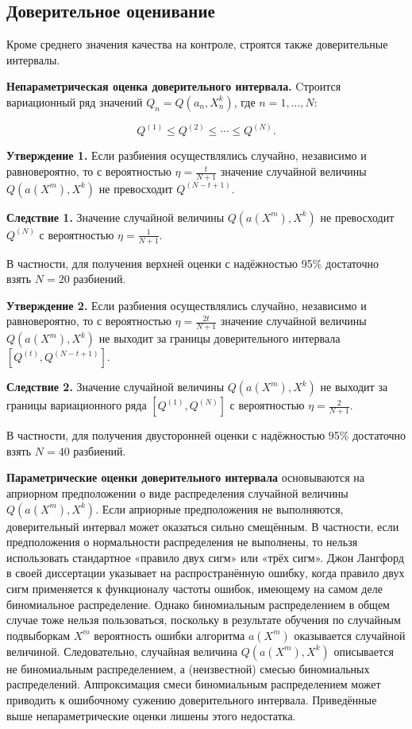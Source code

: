 \subsection{Доверительное оценивание}

Кроме среднего значения качества на контроле, строятся также доверительные интервалы.

\textbf{Непараметрическая оценка доверительного интервала.}
\newline
Cтроится вариационный ряд значений $Q_n = Q(a_n, X^k_n)$, где $n = 1, \ldots, N$:

\[
Q^{(1)} \leq Q^{(2)} \leq \cdots \leq Q^{(N)}.
\]

\textbf{Утверждение 1.} Если разбиения осуществлялись случайно, независимо и равновероятно, то с вероятностью $\eta = \frac{t}{N+1}$ значение случайной величины $Q(a(X^m), X^k)$ не превосходит $Q^{(N-t+1)}$.

\textbf{Следствие 1.} Значение случайной величины $Q(a(X^m), X^k)$ не превосходит $Q^{(N)}$ с вероятностью $\eta = \frac{1}{N+1}$.

В частности, для получения верхней оценки с надёжностью 95\% достаточно взять $N=20$ разбиений.

\textbf{Утверждение 2.} Если разбиения осуществлялись случайно, независимо и равновероятно, то с вероятностью $\eta = \frac{2t}{N+1}$ значение случайной величины $Q(a(X^m), X^k)$ не выходит за границы доверительного интервала $\left[ Q^{(t)}, Q^{(N-t+1)} \right]$.

\textbf{Следствие 2.} Значение случайной величины $Q(a(X^m), X^k)$ не выходит за границы вариационного ряда $\left[ Q^{(1)}, Q^{(N)} \right]$ с вероятностью $\eta = \frac{2}{N+1}$.

В частности, для получения двусторонней оценки с надёжностью 95\% достаточно взять $N=40$ разбиений.

\textbf{Параметрические оценки доверительного интервала} основываются на априорном предположении о виде распределения случайной величины $Q(a(X^m), X^k)$. Если априорные предположения не выполняются, доверительный интервал может оказаться сильно смещённым. В частности, если предположения о нормальности распределения не выполнены, то нельзя использовать стандартное «правило двух сигм» или «трёх сигм». Джон Лангфорд в своей диссертации \cite{Langford2002} указывает на распространённую ошибку, когда правило двух сигм применяется к функционалу частоты ошибок, имеющему на самом деле биномиальное распределение. Однако биномиальным распределением в общем случае тоже нельзя пользоваться, поскольку в результате обучения по случайным подвыборкам $X^m$ вероятность ошибки алгоритма $a(X^m)$ оказывается случайной величиной. Следовательно, случайная величина $Q(a(X^m), X^k)$ описывается не биномиальным распределением, а (неизвестной) смесью биномиальных распределений. Аппроксимация смеси биномиальным распределением может приводить к ошибочному сужению доверительного интервала. Приведённые выше непараметрические оценки лишены этого недостатка.

